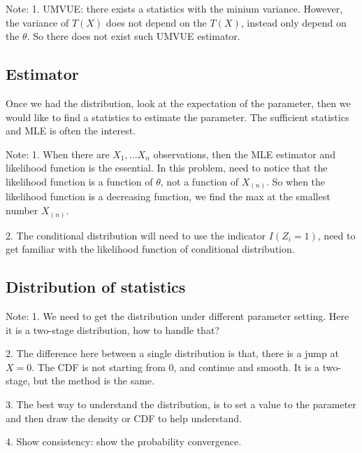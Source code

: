 \begin{mdframed}
Note: 
1. UMVUE: there exists a statistics with the minium variance. However, the variance of $T(X)$ does not depend on the $T(X)$, instead only depend on the $\theta$. So there does not exist such UMVUE estimator.
\end{mdframed}

\subsection{Estimator}
Once we had the distribution, look at the expectation of the parameter, then we would like to find a statistics to estimate the parameter. The sufficient statistics and MLE is often the interest. 

\begin{mdframed}
Note: 
1. When there are $X_1, ... X_n$ observations, then the MLE estimator and likelihood function is the essential. In this problem, need to notice that the likelihood function is a function of $\theta$, not a function of $X_{(n)}$. So when the likelihood function is a decreasing function, we find the max at the smallest number $X_{(n)}$.

2. The conditional distribution will need to use the indicator $I(Z_i =1)$, need to get familiar with the likelihood function of conditional distribution.
\end{mdframed}





\subsection{Distribution of statistics}	
\begin{mdframed}
Note: 
1. We need to get the distribution under different parameter setting. Here it is a two-stage distribution, how to handle that?

2. The difference here between a single distribution is that, there is a jump at $X=0$. The CDF is not starting from 0, and continue and smooth. It is a two-stage, but the method is the same. 

3. The best way to understand the distribution, is to set a value to the parameter and then draw the density or CDF to help understand.

4. Show consistency: show the probability convergence. 

\end{mdframed}



